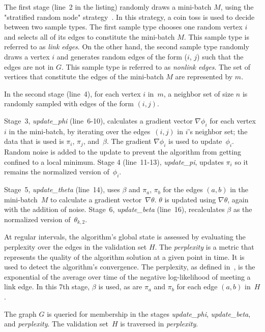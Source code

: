 \begin{figure}[tb]

\end{figure}

The first stage (line~2 in the listing) randomly draws a mini-batch $M$,
using the "stratified random node" strategy~\cite{DBLP:journals/corr/LiAW15}.
In this strategy, a coin toss is used to decide between two sample types.
%
The first sample type
chooses one random vertex $i$ and selects all of its edges to constitute the
mini-batch $M$. This sample type is referred to as \textit{link edges}. On the other
hand, the second sample type randomly draws a vertex $i$ and generates
random edges of the form ($i$, $j$) such that the edges are not in $G$. This
sample type is referred to as \textit{nonlink edges}. The set of vertices that
constitute the edges of the mini-batch $M$ are represented by $m$.

In the second stage (line~4), for each vertex $i$ in~$m$, a neighbor set of
size $n$ is randomly sampled with edges of the form $(i,j)$.

Stage~3, \textit{update\_phi} (line~6-10), calculates a gradient vector
$\nabla\phi_i$ for each vertex $i$ in the mini-batch, by iterating over
the edges~${(i,j)}$ in $i$'s neighbor set; the data that is used is
$\pi_i$, $\pi_j$,
and~$\beta$. The gradient $\nabla\phi_i$ is used to update~$\phi_i$. Random
noise is added to the update to prevent the algorithm from getting confined
to a local minimum.
Stage 4 (line~11-13), \textit{update\_pi}, updates $\pi_i$ so it remains
the normalized version of~$\phi_i$.

Stage~5, \textit{update\_theta} (line~14),
uses $\beta$ and $\pi_a$, $\pi_b$ for the edges $(a,b)$ in the mini-batch~$M$ to
calculate a
gradient vector~$\nabla\theta$. $\theta$ is updated using $\nabla\theta$, again
with the addition of noise. Stage~6, \textit{update\_beta} (line~16),
recalculates $\beta$ as the normalized
version of~$\theta_{k,2}$.

At regular intervals, the algorithm's global state is assessed by
evaluating the perplexity over the edges in the validation set $H$. The
\textit{perplexity} is a metric that represents the quality of the algorithm solution at
a given point in time. It is used to detect the algorithm's
convergence.
The
perplexity, as defined in~\cite{DBLP:journals/corr/LiAW15}, is the exponential
of the average over time of the negative
log-likelihood of meeting a link edge. In this 7th stage, $\beta$ is used,
as are $\pi_a$ and $\pi_b$ for each edge $(a,b)$ in~$H$.

The graph $G$ is queried for membership in the stages \textit{update\_phi},
\textit{update\_beta}, and \textit{perplexity}. The validation set~$H$ is
traversed in \textit{perplexity}.

